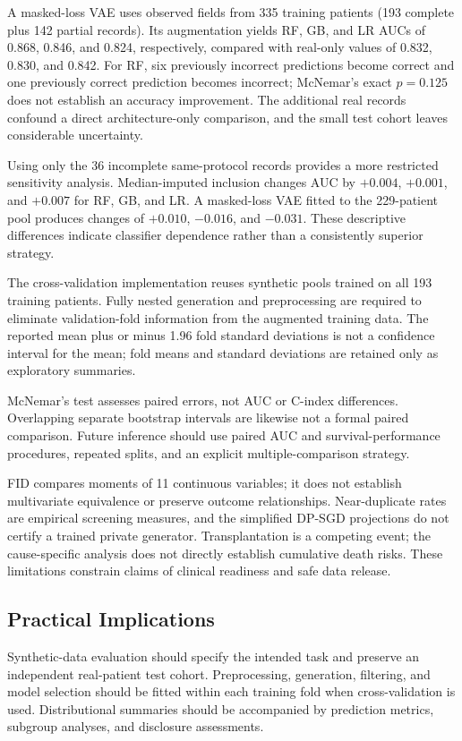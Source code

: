 \documentclass[journal]{IEEEtran}
\begin{document}
A masked-loss VAE uses observed fields from 335 training patients (193 complete plus 142 partial records). Its augmentation yields RF, GB, and LR AUCs of 0.868, 0.846, and 0.824, respectively, compared with real-only values of 0.832, 0.830, and 0.842. For RF, six previously incorrect predictions become correct and one previously correct prediction becomes incorrect; McNemar's exact $p=0.125$ does not establish an accuracy improvement. The additional real records confound a direct architecture-only comparison, and the small test cohort leaves considerable uncertainty.

Using only the 36 incomplete same-protocol records provides a more restricted sensitivity analysis. Median-imputed inclusion changes AUC by $+0.004$, $+0.001$, and $+0.007$ for RF, GB, and LR. A masked-loss VAE fitted to the 229-patient pool produces changes of $+0.010$, $-0.016$, and $-0.031$. These descriptive differences indicate classifier dependence rather than a consistently superior strategy.

The cross-validation implementation reuses synthetic pools trained on all 193 training patients. Fully nested generation and preprocessing are required to eliminate validation-fold information from the augmented training data. The reported mean plus or minus 1.96 fold standard deviations is not a confidence interval for the mean; fold means and standard deviations are retained only as exploratory summaries.

McNemar's test assesses paired errors, not AUC or C-index differences. Overlapping separate bootstrap intervals are likewise not a formal paired comparison. Future inference should use paired AUC and survival-performance procedures, repeated splits, and an explicit multiple-comparison strategy.

FID compares moments of 11 continuous variables; it does not establish multivariate equivalence or preserve outcome relationships. Near-duplicate rates are empirical screening measures, and the simplified DP-SGD projections do not certify a trained private generator. Transplantation is a competing event; the cause-specific analysis does not directly establish cumulative death risks. These limitations constrain claims of clinical readiness and safe data release.

\subsection{Practical Implications}

Synthetic-data evaluation should specify the intended task and preserve an independent real-patient test cohort. Preprocessing, generation, filtering, and model selection should be fitted within each training fold when cross-validation is used. Distributional summaries should be accompanied by prediction metrics, subgroup analyses, and disclosure assessments.
\end{document}
